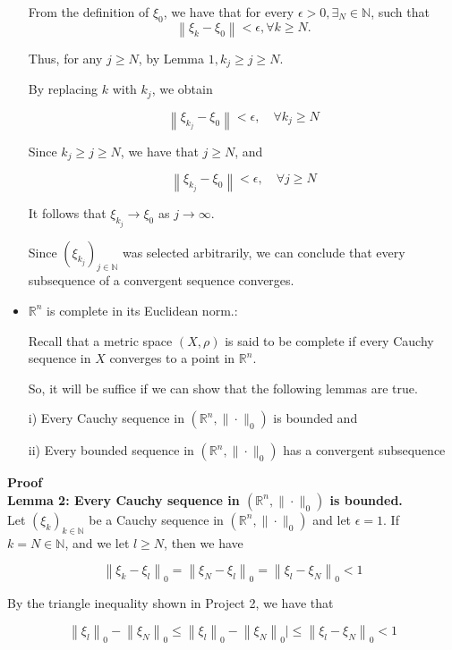 \documentclass{article}
\begin{document}
\begin{itemize}
From the definition of $\xi_{0}$, we have that for every $\epsilon>0,  \exists_N \in \mathbb{N}$, such that 
$$\left\|\xi_{k}-\xi_{0}\right\|<\epsilon, \forall k \geq N.$$

Thus, for any $j \geq N$, by Lemma $1, k_{j} \geq j \geq N$.

By replacing $k$ with $k_{j}$, we obtain

$$
\left\|\xi_{k_{j}}-\xi_{0}\right\|<\epsilon, \quad \forall k_{j} \geq N
$$

Since $k_{j} \geq j \geq N$, we have that $j \geq N$, and

$$
\left\|\xi_{k_{j}}-\xi_{0}\right\|<\epsilon, \quad \forall j \geq N
$$

It follows  that $\xi_{k_{j}} \rightarrow \xi_{0}$ as $j \rightarrow \infty$. 

Since $\left(\xi_{k_{j}}\right)_{j \in \mathbb{N}}$ was selected arbitrarily, we can conclude that every subsequence of a convergent sequence converges.

\item  $\mathbb{R}^{n}$ is complete in its Euclidean norm.:

Recall that a metric space $(X, \rho)$ is said to be complete if every Cauchy sequence in $X$ converges to a point in $\mathbb{R}^{n}$.

So, it will be suffice if we can show that the following lemmas are true.

i) Every Cauchy sequence in $\left(\mathbb{R}^{n},\|\cdot\|_{0}\right)$ is bounded and 

ii) Every bounded sequence in $\left(\mathbb{R}^{n},\|\cdot\|_{0}\right)$ has a convergent subsequence
\end{itemize}

\textbf{Proof}\\

\textbf{Lemma 2: Every Cauchy sequence in $\left(\mathbb{R}^{n},\|\cdot\|_{0}\right)$ is bounded.}\\

Let $\left(\xi_{k}\right)_{k \in \mathbb{N}}$ be a Cauchy sequence in $\left(\mathbb{R}^{n},\|\cdot\|_{0}\right)$ and let $\epsilon=1$. If $k=N \in \mathbb{N}$, and we let $l \geq N$, then we have

$$
\left\|\xi_{k}-\xi_{l}\right\|_{0}=\left\|\xi_{N}-\xi_{l}\right\|_{0}=\left\|\xi_{l}-\xi_{N}\right\|_{0}<1
$$

By the triangle inequality shown in Project 2, we have that

$$
\left\|\xi_{l}\right\|_{0}-\left\|\xi_{N}\right\|_{0} \leq\left\|\xi_{l}\right\|_{0}-\left\|\xi_{N}\right\|_{0} \mid \leq\left\|\xi_{l}-\xi_{N}\right\|_{0}<1
$$
\end{document}

